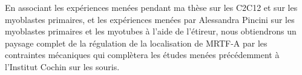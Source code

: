 En associant les expériences menées pendant ma thèse sur les C2C12 et sur les myoblastes primaires, et les expériences menées par Alessandra Pincini sur les myoblastes primaires et les myotubes à l'aide de l'étireur, nous obtiendrons un paysage complet de la régulation de la localisation de MRTF-A par les contraintes mécaniques qui complètera les études menées précédemment à l'Institut Cochin sur les souris. 




%
%